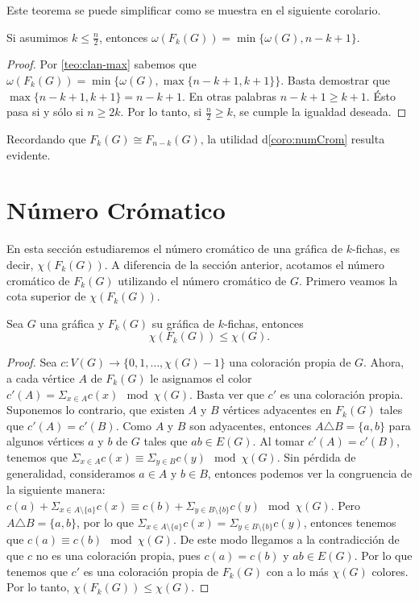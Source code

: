 Este teorema se puede simplificar como se muestra en el siguiente corolario.

\begin{corolario}
\label{coro:numCrom}
    Si asumimos $k \leq \frac{n}{2}$, entonces $\omega(F_k(G))= \min\{\omega(G),
    n-k+1\}$.
\end{corolario}

\begin{proof}
    Por \cref{teo:clan-max} sabemos que $\omega(F_k(G))= \min \{\omega(G), \max
    \{n-k+1,k+1\}\}$. Basta demostrar que $\max \{n-k+1, k+1\} = n-k+1$. En
    otras palabras $n-k+1 \geq k+1$. \'Esto pasa si y s\'olo si $n \geq 2k$. Por
    lo tanto, si $\frac{n}{2} \geq k$, se cumple la igualdad deseada.
\end{proof}

Recordando que $F_k(G) \cong F_{n-k}(G)$, la utilidad  d\cref{coro:numCrom}
resulta evidente.

\section{N\'umero Cr\'omatico}%
\label{sec:num cromatico}

En esta secci\'on estudiaremos el n\'umero crom\'atico de una gr\'afica de
$k$-fichas, es decir, $\chi (F_k(G))$. A diferencia de la secci\'on anterior,
acotamos el n\'umero crom\'atico de $F_k(G)$ utilizando el n\'umero crom\'atico
de $G$. Primero veamos la cota superior de $ \chi (F_k(G))$.

\begin{teorema}
\label{teo:num cromatico de G y F(G)}
    Sea $G$ una gr\'afica y $F_k(G)$ su gr\'afica de $k$-fichas, entonces
    \[
        \chi(F_k(G)) \leq \chi (G).
    \]
\end{teorema}

\begin{proof}
    Sea $c: V(G) \to \{0,1, \dots, \chi(G)-1\}$ una coloraci\'on propia de $G$.
    Ahora, a cada v\'ertice $A$ de $F_k(G)$ le asignamos el color $ c'(A)=
    \Sigma_{x \in A}c(x) \mod \chi(G)$. Basta ver que $c'$ es una coloraci\'on
    propia. Suponemos lo contrario, que existen $A$ y $B$ v\'ertices adyacentes
    en $F_k(G)$ tales que $c'(A) = c'(B)$. Como $A$ y $B$ son adyacentes,
    entonces $A \triangle B = \{a,b\}$ para algunos v\'ertices $a$ y $b$ de $G$
    tales que $ab \in E(G)$. Al tomar $c'(A) = c'(B)$, tenemos que $\Sigma_{x
    \in A}c(x) \equiv \Sigma_{y \in B}c(y) \mod \chi(G)$. Sin p\'erdida de
    generalidad, consideramos $a \in A$ y $b \in B$, entonces podemos ver la
    congruencia de la siguiente manera: $c(a) + \Sigma_{x \in A
    \setminus\{a\}}c(x) \equiv c(b) + \Sigma_{y \in B\setminus\{b\}}c(y) \mod
    \chi(G)$. Pero $A \triangle B = \{a,b\}$, por lo que $\Sigma_{x \in
    A\setminus\{a\}}c(x)=\Sigma_{y \in B\setminus\{b\}}c(y)$, entonces tenemos
    que $c(a) \equiv c(b) \mod \chi(G)$. De este modo llegamos a la
    contradicci\'on de que $c$ no es una coloraci\'on propia, pues $c(a) = c(b)$
    y $ab \in E(G)$. Por lo que tenemos que $c'$ es una coloraci\'on propia de
    $F_k(G)$ con a lo m\'as $\chi (G)$ colores. Por lo tanto, $\chi(F_k(G)) \leq
    \chi (G)$.
\end{proof}

